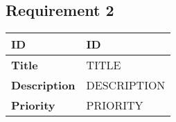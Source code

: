 \subsection{Requirement 2}

\begin{table}[H]
    \begin{tabularx}{\textwidth}{|l|l|}
        \textbf{ID} & ID \\ \hline
        \textbf{Title} & TITLE \\ \hline
        \textbf{Description} & DESCRIPTION \\ \hline
        \textbf{Priority} & PRIORITY \\\hline
    \end{tabularx}
\end{table}
